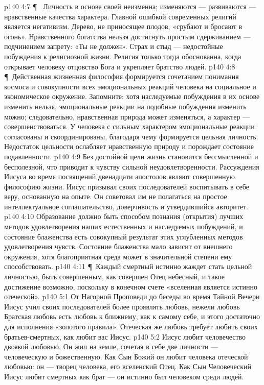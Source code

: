 \vs p140 4:7 \P\  Личность в основе своей неизменна; изменяются --- развиваются --- нравственные качества характера. Главной ошибкой современных религий является негативизм. Дерево, не приносящее плодов, «срубают и бросают в огонь». Нравственного богатства нельзя достигнуть простым сдерживанием --- подчинением запрету: «Ты не должен». Страх и стыд --- недостойные побуждения к религиозной жизни. Религия только тогда обоснованна, когда открывает человеку отцовство Бога и укрепляет братство людей.
\vs p140 4:8 \P\ Действенная жизненная философия формируется сочетанием понимания космоса и совокупности всех эмоциональных реакций человека на социальное и экономическое окружение. Запомните: хотя наследуемые побуждения в их основе изменить нельзя, эмоциональные реакции на подобные побуждения изменить можно; следовательно, нравственная природа может изменяться, а характер --- совершенствоваться. У человека с сильным характером эмоциональные реакции согласованы и скоординированы, благодаря чему формируется цельная личность. Недостаток цельности ослабляет нравственную природу и порождает состояние подавленности.
\vs p140 4:9 Без достойной цели жизнь становится бессмысленной и бесполезной, что приводит к чувству сильной неудовлетворенности. Рассуждения Иисуса во время посвящений двенадцати апостолов являют совершенную философию жизни. Иисус призывал своих последователей воспитывать в себе веру, основанную на опыте. Он советовал им не полагаться на простое интеллектуальное соглашательство, доверчивость и утвердившийся авторитет.
\vs p140 4:10 Образование должно быть способом познания (открытия) лучших методов удовлетворения наших естественных и наследуемых побуждений, и состояние блаженства есть совокупный результат этих углубленных методов удовлетворения чувств. Состояние блаженства мало зависит от внешнего окружения, хотя благоприятная среда может в значительной степени ему способствовать.
\vs p140 4:11 \P\ Каждый смертный истинно жаждет стать цельной личностью, быть совершенным, как совершен Отец небесный, и такое достижение возможно, поскольку в конечном счете «вселенная является истинно отеческой».
\vs p140 5:1 От Нагорной Проповеди до беседы во время Тайной Вечери Иисус учил своих последователей более проявлять  любовь, нежели любовь  Братская любовь есть любовь к ближнему, как к самому себе, и этого достаточно для исполнения «золотого правила». Отеческая же любовь требует любить своих братьев\hyp{}смертных, как любит вас Иисус.
\vs p140 5:2 Иисус любит человечество двоякой любовью. Он жил на земле, сочетая в себе две личности --- человеческую и божественную. Как Сын Божий он любит человека отеческой любовью: он --- творец человека, его вселенский Отец. Как Сын Человеческий Иисус любит смертных как брат --- он истинно был человеком среди людей.
